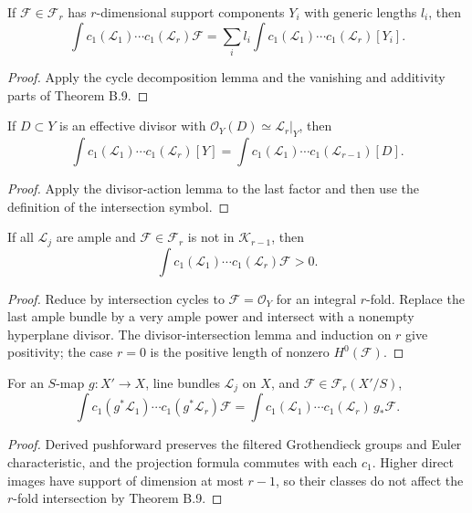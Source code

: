 \begin{lemma}\label{kps-lem-intersection-cycles}
If $\mathcal F\in\mathcal F_r$ has $r$-dimensional support components $Y_i$
with generic lengths $l_i$, then
\[
 \int c_1(\mathcal L_1)\cdots c_1(\mathcal L_r)\mathcal F
 =\sum_i l_i\int c_1(\mathcal L_1)\cdots c_1(\mathcal L_r)[Y_i].
\]
\end{lemma}
\begin{proof}
Apply the cycle decomposition lemma and the vanishing and additivity parts of
Theorem B.9.
\end{proof}

\begin{lemma}\label{kps-lem-intersection-divisor}
If $D\subset Y$ is an effective divisor with $\mathcal O_Y(D)\simeq
\mathcal L_r|_Y$, then
\[
 \int c_1(\mathcal L_1)\cdots c_1(\mathcal L_r)[Y]
 =\int c_1(\mathcal L_1)\cdots c_1(\mathcal L_{r-1})[D].
\]
\end{lemma}
\begin{proof}
Apply the divisor-action lemma to the last factor and then use the definition
of the intersection symbol.
\end{proof}

\begin{proposition}\label{kps-prop-ample-positivity}
If all $\mathcal L_j$ are ample and $\mathcal F\in\mathcal F_r$ is not in
$\mathcal K_{r-1}$, then
\[
 \int c_1(\mathcal L_1)\cdots c_1(\mathcal L_r)\mathcal F>0.
\]
\end{proposition}
\begin{proof}
Reduce by intersection cycles to $\mathcal F=\mathcal O_Y$ for an integral
$r$-fold. Replace the last ample bundle by a very ample power and intersect
with a nonempty hyperplane divisor. The divisor-intersection lemma and
induction on $r$ give positivity; the case $r=0$ is the positive length of
nonzero $H^0(\mathcal F)$.
\end{proof}

\begin{lemma}\label{kps-lem-intersection-pushforward}
For an $S$-map $g:X'\to X$, line bundles $\mathcal L_j$ on $X$, and
$\mathcal F\in\mathcal F_r(X'/S)$,
\[
 \int c_1(g^*\mathcal L_1)\cdots c_1(g^*\mathcal L_r)\mathcal F
 =\int c_1(\mathcal L_1)\cdots c_1(\mathcal L_r)\,g_*\mathcal F.
\]
\end{lemma}
\begin{proof}
Derived pushforward preserves the filtered Grothendieck groups and Euler
characteristic, and the projection formula commutes with each $c_1$. Higher
direct images have support of dimension at most $r-1$, so their classes do not
affect the $r$-fold intersection by Theorem B.9.
\end{proof}

